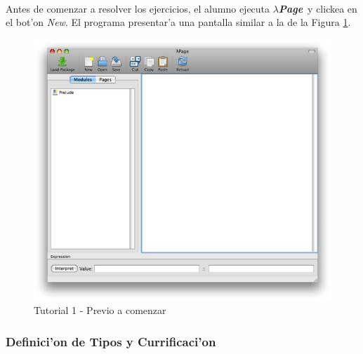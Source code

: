 \documentclass[a4paper]{article}
\newcommand{\hpage}{\textbf{\textsl{$\lambda$Page}}}
\begin{document}
\paragraph{}Antes de comenzar a resolver los ejercicios, el alumno ejecuta \hpage\ y clickea en el bot'on \textsl{New}.  El programa presentar'a una pantalla similar a la de la Figura \ref{tut100}.
\begin{figure}[hp]
	\begin{center}
        	\includegraphics[width=.75\textwidth]{pictures/tut1/00}
		\caption{Tutorial 1 - Previo a comenzar}
		\label{tut100}
	\end{center}
\end{figure}

\newpage
\subsubsection{Definici'on de Tipos y Currificaci'on}
\end{document}
